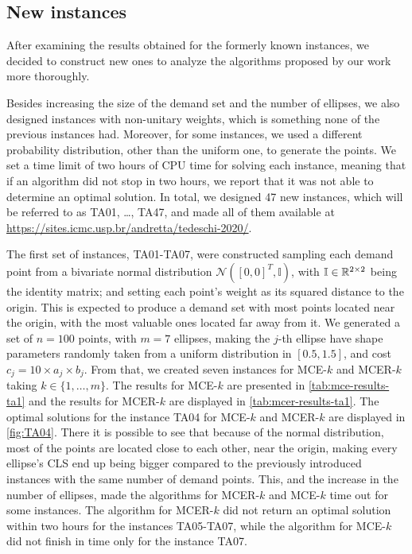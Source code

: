 \subsection{New instances}

After examining the results obtained for the formerly known instances, we decided to construct new ones to analyze the algorithms proposed by our work more thoroughly.

Besides increasing the size of the demand set and the number of ellipses, we also designed instances with non-unitary weights, which is something none of the previous instances had. 
Moreover, for some instances, we used a different probability distribution, other than the uniform one, to generate the points.
We set a time limit of two hours of CPU time for solving each instance, meaning that if an algorithm did not stop in two hours, we report that it was not able to determine an optimal solution. 
In total, we designed 47 new instances, which will be referred to as TA01, \dots, TA47, and made all of them available at \url{https://sites.icmc.usp.br/andretta/tedeschi-2020/}.

The first set of instances, TA01-TA07, were constructed sampling each demand point from a bivariate normal distribution $\mathcal{N}([0, 0]^T, \mathbb{I})$, with $\mathbb{I} \in \mathbb{R}^{2\times 2}$ being the identity matrix; and setting each point's weight as its squared distance to the origin. This is expected to produce a demand set with most points located near the origin, with the most valuable ones located far away from it.
We generated a set of $n=100$ points, with $m=7$ ellipses, making the $j$-th ellipse have shape parameters randomly taken from a uniform distribution in $[0.5, 1.5]$, and cost $c_j=10\times a_j \times b_j$. From that, we created seven instances for MCE-$k$ and MCER-$k$ taking $k \in \{1, \dots, m\}$. The results for MCE-$k$ are presented in \autoref{tab:mce-results-ta1} and the results for MCER-$k$ are displayed in \autoref{tab:mcer-results-ta1}.
The optimal solutions for the instance TA04 for MCE-$k$ and MCER-$k$ are displayed in \autoref{fig:TA04}. There it is possible to see that because of the normal distribution, most of the points are located close to each other, near the origin, making every ellipse's CLS end up being bigger compared to the previously introduced instances with the same number of demand points. 
This, and the increase in the number of ellipses, made the algorithms for MCER-$k$ and MCE-$k$ time out for some instances. The algorithm for MCER-$k$ did not return an optimal solution within two hours for the instances TA05-TA07, while the algorithm for MCE-$k$ did not finish in time only for the instance TA07. 

